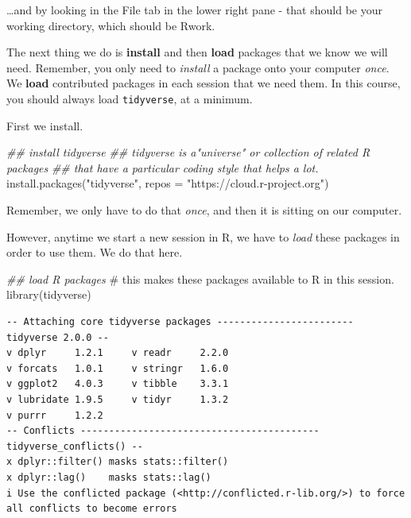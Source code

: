 \documentclass[
  letterpaper,
  DIV=11,
  numbers=noendperiod]{scrreprt}
\newenvironment{Shaded}{\begin{snugshade}}{\end{snugshade}}
\newcommand{\AttributeTok}[1]{\textcolor[rgb]{0.40,0.45,0.13}{#1}}
\newcommand{\CommentTok}[1]{\textcolor[rgb]{0.37,0.37,0.37}{#1}}
\newcommand{\DocumentationTok}[1]{\textcolor[rgb]{0.37,0.37,0.37}{\textit{#1}}}
\newcommand{\FunctionTok}[1]{\textcolor[rgb]{0.28,0.35,0.67}{#1}}
\newcommand{\NormalTok}[1]{\textcolor[rgb]{0.00,0.23,0.31}{#1}}
\newcommand{\StringTok}[1]{\textcolor[rgb]{0.13,0.47,0.30}{#1}}
\begin{document}
\ldots and by looking in the File tab in the lower right pane - that
should be your working directory, which should be Rwork.

The next thing we do is \textbf{install} and then \textbf{load} packages
that we know we will need. Remember, you only need to \emph{install} a
package onto your computer \emph{once}. We \textbf{load} contributed
packages in each session that we need them. In this course, you should
always load \texttt{tidyverse}, at a minimum.

First we install.

\begin{Shaded}
\begin{Highlighting}[]
\DocumentationTok{\#\# install tidyverse }
\DocumentationTok{\#\# tidyverse is a"universe" or collection of related R packages }
\DocumentationTok{\#\# that have a particular coding style that helps a lot.}
\FunctionTok{install.packages}\NormalTok{(}\StringTok{"tidyverse"}\NormalTok{, }\AttributeTok{repos =} \StringTok{"https://cloud.r{-}project.org"}\NormalTok{)}
\end{Highlighting}
\end{Shaded}

Remember, we only have to do that \emph{once}, and then it is sitting on
our computer.

However, anytime we start a new session in R, we have to \emph{load}
these packages in order to use them. We do that here.

\begin{Shaded}
\begin{Highlighting}[]
\DocumentationTok{\#\# load R packages }
\CommentTok{\# this makes these packages available to R in this session.}
\FunctionTok{library}\NormalTok{(tidyverse)}
\end{Highlighting}
\end{Shaded}

\begin{verbatim}
-- Attaching core tidyverse packages ------------------------ tidyverse 2.0.0 --
v dplyr     1.2.1     v readr     2.2.0
v forcats   1.0.1     v stringr   1.6.0
v ggplot2   4.0.3     v tibble    3.3.1
v lubridate 1.9.5     v tidyr     1.3.2
v purrr     1.2.2     
-- Conflicts ------------------------------------------ tidyverse_conflicts() --
x dplyr::filter() masks stats::filter()
x dplyr::lag()    masks stats::lag()
i Use the conflicted package (<http://conflicted.r-lib.org/>) to force all conflicts to become errors
\end{verbatim}
\end{document}
